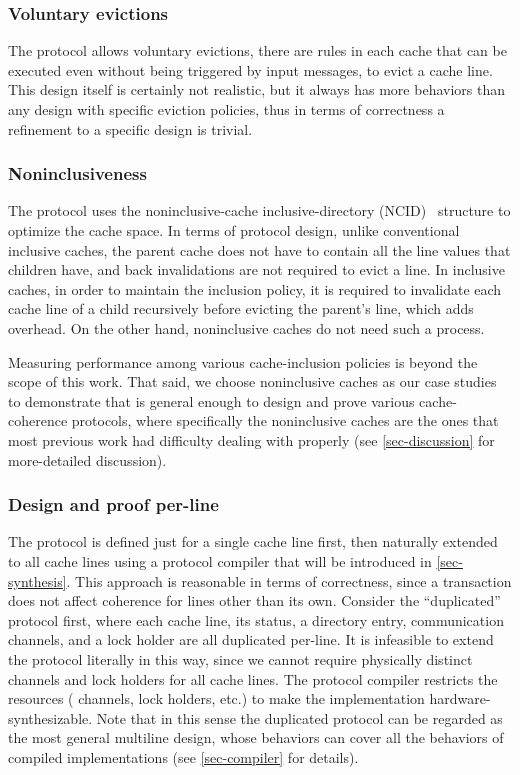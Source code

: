 \documentclass[sigplan,10pt,review,anonymous,screen]{acmart}\settopmatter{printfolios=true,printccs=false,printacmref=false}
\begin{document}
\subsubsection{Voluntary evictions}

The protocol allows voluntary evictions, \ie{} there are rules in each cache that can be executed even without being triggered by input messages, to evict a cache line.
This design itself is certainly not realistic, but it always has more behaviors than any design with specific eviction policies, thus in terms of correctness a refinement to a specific design is trivial.

\subsubsection{Noninclusiveness}
\label{sec-noninclusive}

The protocol uses the noninclusive-cache inclusive-directory (NCID)~\cite{Zhao:2010} structure to optimize the cache space.
In terms of protocol design, unlike conventional inclusive caches, the parent cache does not have to contain all the line values that children have, and back invalidations are not required to evict a line.
In inclusive caches, in order to maintain the inclusion policy, it is required to invalidate each cache line of a child recursively before evicting the parent's line, which adds overhead.
On the other hand, noninclusive caches do not need such a process.

Measuring performance among various cache-inclusion policies is beyond the scope of this work.
That said, we choose noninclusive caches as our case studies to demonstrate that \hemiola{} is general enough to design and prove various cache-coherence protocols, where specifically the noninclusive caches are the ones that most previous work had difficulty dealing with properly (see \autoref{sec-discussion} for more-detailed discussion).

\subsubsection{Design and proof per-line}
\label{sec-design-line}

The protocol is defined just for a single cache line first, then naturally extended to all cache lines using a protocol compiler that will be introduced in \autoref{sec-synthesis}.
This approach is reasonable in terms of correctness, since a transaction does not affect coherence for lines other than its own.
Consider the ``duplicated'' protocol first, where each cache line, its status, a directory entry, communication channels, and a lock holder are all duplicated per-line.
It is infeasible to extend the protocol literally in this way, since we cannot require physically distinct channels and lock holders for all cache lines.
The protocol compiler restricts the resources (\eg{} channels, lock holders, etc.) to make the implementation hardware-synthesizable.
Note that in this sense the duplicated protocol can be regarded as the most general multiline design, whose behaviors can cover all the behaviors of compiled implementations (see \autoref{sec-compiler} for details).
\end{document}
